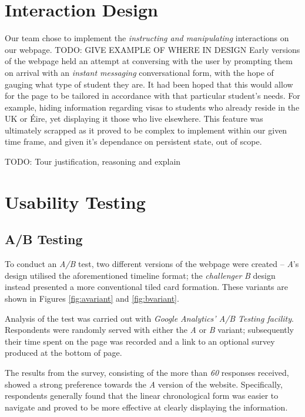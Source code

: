 \documentclass[a4paper, notoc]{tufte-handout}
\begin{document}
\section{Interaction Design}\label{label:interaction-design}

Our team chose to implement the \textit{instructing and manipulating} interactions on our webpage. TODO: GIVE EXAMPLE OF WHERE IN DESIGN Early versions of the webpage held an attempt at conversing with the user by prompting them on arrival with an \textit{instant messaging} conversational form, with the hope of gauging what type of student they are. It had been hoped that this would allow for the page to be tailored in accordance with that particular student's needs. For example, hiding information regarding visas to students who already reside in the UK or Éire, yet displaying it those who live elsewhere. This feature was ultimately scrapped as it proved to be complex to implement within our given time frame, and given it's dependance on persistent state, out of scope.

TODO: Tour justification, reasoning and explain

\section{Usability Testing}\label{sec:usability-testing}

\subsection{A/B Testing}\label{subsec:a-b-testing}

To conduct an \textit{A/B} test, two different versions of the webpage were created -- \textit{A}'s design utilised the aforementioned timeline format; the \textit{challenger} \textit{B} design instead presented a more conventional tiled card formation. These variants are shown in Figures \ref{fig:avariant} and \ref{fig:bvariant}.

Analysis of the test was carried out with \textit{Google Analytics' A/B Testing facility}. Respondents were randomly served with either the \textit{A} or \textit{B} variant; subsequently their time spent on the page was recorded and a link to an optional survey produced at the bottom of page.

The results from the survey, consisting of the more than \emph{60} responses received, showed a strong preference towards the \textit{A} version of the website. Specifically, respondents generally found that the linear chronological form was easier to navigate and proved to be more effective at clearly displaying the information.
\end{document}

